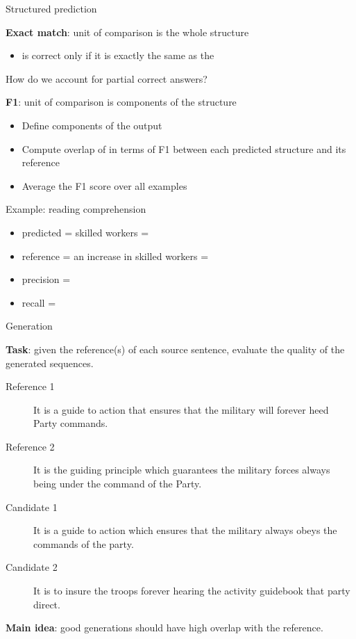 \documentclass[usenames,dvipsnames,notes,11pt,aspectratio=169,hyperref={colorlinks=true, linkcolor=blue}]{beamer}
\begin{document}
\begin{frame}
    {Structured prediction}

    \textbf{Exact match}: unit of comparison is the whole structure\\
    \begin{itemize}
        \item {} is correct only if it is exactly the same as the 
    \end{itemize}

    \pause
    How do we account for partial correct answers?

    \textbf{F1}: unit of comparison is components of the structure\\
    \begin{itemize}
        \item Define components of the output
        \item Compute overlap of  in terms of F1 between each predicted structure and its reference 
        \item Average the F1 score over all examples
    \end{itemize}
    \pause

    Example: reading comprehension\\
    \begin{itemize}
        \item predicted = skilled workers = 
        \item reference = an increase in skilled workers = 
        \item precision =
        \item recall =
    \end{itemize}
\end{frame}

\begin{frame}
    {Generation}

    \textbf{Task}: given the reference(s) of each source sentence, evaluate the quality of the generated sequences.
    \begin{description}
        \item[Reference 1] It is a guide to action that ensures that the military will forever heed Party commands.
        \item[Reference 2] It is the guiding principle which guarantees the military forces always being under the command of the Party. 
        \item[Candidate 1] It is a guide to action which ensures that the military always obeys the commands of the party.
        \item[Candidate 2] It is to insure the troops forever hearing the activity guidebook that party direct.
    \end{description}

    \pause
    \textbf{Main idea}: good generations should have high overlap with the reference.
\end{frame}
\end{document}
